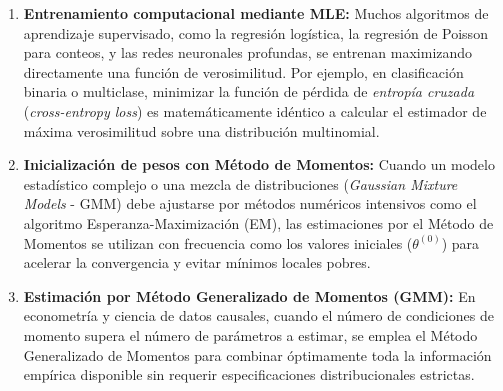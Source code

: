 \begin{enumerate}
	\item \textbf{Entrenamiento computacional mediante MLE:} Muchos algoritmos de aprendizaje supervisado, como la regresión logística, la regresión de Poisson para conteos, y las redes neuronales profundas, se entrenan maximizando directamente una función de verosimilitud. Por ejemplo, en clasificación binaria o multiclase, minimizar la función de pérdida de \emph{entropía cruzada} (\emph{cross-entropy loss}) es matemáticamente idéntico a calcular el estimador de máxima verosimilitud sobre una distribución multinomial.

	\item \textbf{Inicialización de pesos con Método de Momentos:} Cuando un modelo estadístico complejo o una mezcla de distribuciones (\emph{Gaussian Mixture Models} - GMM) debe ajustarse por métodos numéricos intensivos como el algoritmo Esperanza-Maximización (EM), las estimaciones por el Método de Momentos se utilizan con frecuencia como los valores iniciales ($\theta^{(0)}$) para acelerar la convergencia y evitar mínimos locales pobres.

	\item \textbf{Estimación por Método Generalizado de Momentos (GMM):} En econometría y ciencia de datos causales, cuando el número de condiciones de momento supera el número de parámetros a estimar, se emplea el Método Generalizado de Momentos para combinar óptimamente toda la información empírica disponible sin requerir especificaciones distribucionales estrictas.
\end{enumerate}
